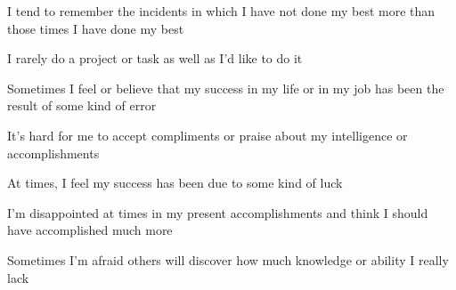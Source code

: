 \documentclass[aspectratio=169]{beamer}
\begin{document}
\begin{frame}
  \begin{center}
    \Huge I tend to remember the incidents in which I have not done my best more than those times I have done my best
  \end{center}
\end{frame}

\begin{frame}
  \begin{center}
    \Huge  I rarely do a project or task as well as I’d like to do it
  \end{center}
\end{frame}

\begin{frame}
  \begin{center}
    \Huge  Sometimes I feel or believe that my success in my life or in my job has been the result of some kind of error
  \end{center}
\end{frame}

\begin{frame}
  \begin{center}
    \Huge    It’s  hard  for  me  to  accept  compliments  or  praise  about  my  intelligence  or  accomplishments
  \end{center}
\end{frame}

\begin{frame}
  \begin{center}
    \Huge At times, I feel my success has been due to some kind of luck
  \end{center}
\end{frame}

\begin{frame}
  \begin{center}
    \Huge   I’m  disappointed  at  times  in  my  present  accomplishments  and  think  I should have accomplished much more
  \end{center}
\end{frame}

\begin{frame}
  \begin{center}
    \Huge   Sometimes I’m afraid others will discover how much knowledge or ability I really lack
  \end{center}
\end{frame}
\end{document}
